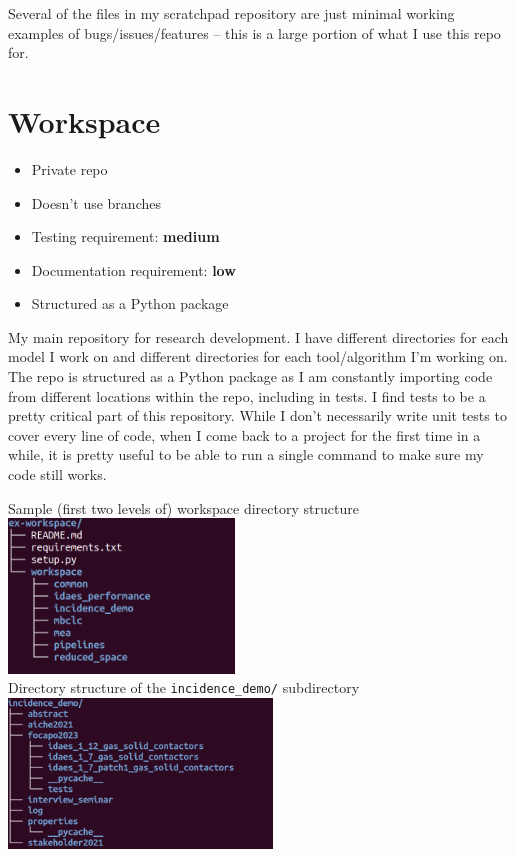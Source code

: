 \documentclass{article}
\begin{document}
Several of the files in my scratchpad repository are just minimal
working examples of bugs/issues/features -- this is a large portion
of what I use this repo for.

\section{Workspace}
\begin{itemize}
  \item Private repo
  \item Doesn't use branches
  \item Testing requirement: {\color{purple}\bf medium}
  \item Documentation requirement: {\color{blue}\bf low}
  \item Structured as a Python package
\end{itemize}
My main repository for research development. I have different
directories for each model I work on and different directories for
each tool/algorithm I'm working on.
The repo is structured as a Python package as I am constantly
importing code from different locations within the repo,
including in tests.
I find tests to be a pretty critical part of this repository. While
I don't necessarily write unit tests to cover every line of code,
when I come back to a project for the first time in a while, it is
pretty useful to be able to run a single command to make sure
my code still works.
\begin{center}
  Sample (first two levels of) workspace directory structure\\
  \includegraphics[width=6cm]{workspace_tree.png}
  \\
  Directory structure of the \texttt{incidence\_demo/} subdirectory
  \includegraphics[width=7cm]{incidence_demo_tree.png}
\end{center}
\end{document}
